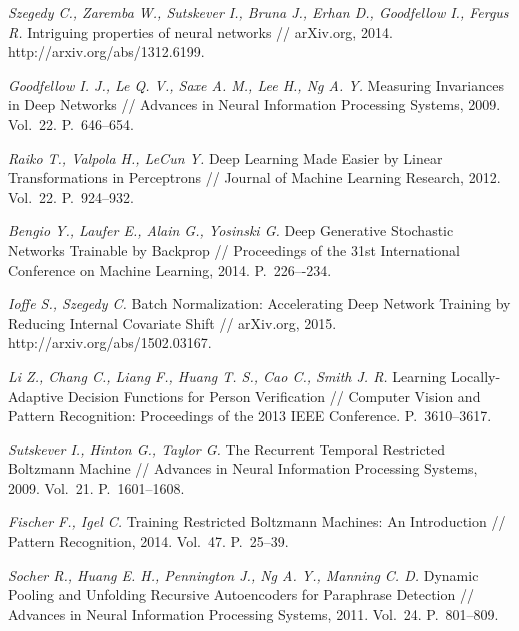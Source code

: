 \documentclass[12pt]{article}
\begin{document}
\begin{thebibliography}{10}
\emph{Szegedy C.,
Zaremba W.,
Sutskever I.,
Bruna J.,
Erhan D.,
Goodfellow I.,
Fergus R.}
Intriguing properties of neural networks // arXiv.org, 2014. http://arxiv.org/abs/1312.6199.

\emph{Goodfellow I. J., Le Q. V., Saxe A. M., Lee H., Ng A. Y.}
Measuring Invariances in Deep Networks // Advances in Neural Information Processing Systems, 2009. Vol.~22. P.~646--654.


\emph{Raiko T.,  Valpola H., LeCun Y.}
Deep Learning Made Easier by Linear Transformations in
Perceptrons // Journal of Machine Learning Research, 2012. Vol.~22. P.~924--932.

\emph{Bengio Y.,  Laufer E., Alain G.,  Yosinski G. }
Deep Generative Stochastic Networks Trainable by Backprop // Proceedings of the 31st International Conference on Machine Learning, 2014. P.~226–-234.


\emph{Ioffe S., Szegedy C.}
Batch Normalization: Accelerating Deep Network Training by Reducing Internal Covariate Shift // arXiv.org, 2015. http://arxiv.org/abs/1502.03167.

\emph{Li Z.,  Chang C., Liang F., Huang T. S.,  Cao C.,  Smith J. R.}
Learning Locally-Adaptive Decision Functions for Person Verification // Computer Vision and Pattern Recognition: Proceedings of the 2013 IEEE Conference. P.~3610--3617.

\emph{Sutskever I.,  Hinton G.,  Taylor G.}
The Recurrent Temporal Restricted Boltzmann
Machine // Advances in Neural Information Processing Systems, 2009. Vol.~21. P.~1601--1608.

\emph{Fischer F., Igel C.}
Training Restricted Boltzmann Machines: An Introduction // Pattern Recognition, 2014. Vol.~47. P.~25--39.

\emph{Socher R.,  Huang E. H.,  Pennington J.,  Ng A. Y., Manning C. D.}
Dynamic Pooling and Unfolding Recursive Autoencoders for Paraphrase Detection // Advances in Neural Information Processing Systems, 2011. Vol.~24. P.~801--809.




\end{thebibliography}
\end{document}
